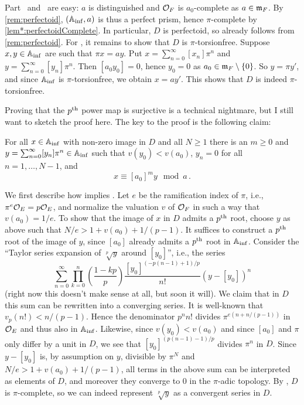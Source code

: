 \begin{proof*}
	Part~ and~ are easy: $a$ is distinguished and $\mathcal{O}_F$ is $a_0$-complete as $a\in\mathfrak{m}_F$. By \cref{rem:perfectoid}, $(\mathbb{A}_{\mathrm{inf}},a)$ is thus a perfect prism, hence $\pi$-complete by \cref{lem*:perfectoidComplete}. In particular, $D$ is perfectoid, so  already follows from \cref{rem:perfectoid}. For , it remains to show that $D$ is $\pi$-torsionfree. Suppose $x,y\in\mathbb{A}_{\mathrm{inf}}$ are such that $\pi x=ay$. Put $x=\sum_{n=0}^\infty[x_n]\pi^n$ and $y=\sum_{n=0}^\infty[y_n]\pi^n$. Then $[a_0y_0]=0$, hence $y_0=0$ as $a_0\in\mathfrak{m}_F\setminus\{0\}$. So $y=\pi y'$, and since $\mathbb{A}_{\mathrm{inf}}$ is $\pi$-torsionfree, we obtain $x=ay'$. This shows that $D$ is indeed $\pi$-torsionfree.
	
	Proving that the $p^{\text{th}}$ power map is surjective is a technical nightmare, but I still want to sketch the proof here. The key to the proof is the following claim:
	\begin{alphanumerate}
		\item[\itememph{*}] For all $x\in\mathbb{A}_{\mathrm{inf}}$ with non-zero image in $D$ and all $N\geq 1$ there is an $m\geq 0$ and $y=\sum_{n=0}^\infty[y_n]\pi^n\in\mathbb{A}_{\mathrm{inf}}$ such that $v(y_0)< v(a_0)$, $y_n=0$ for all $n=1,\dotsc,N-1$, and
		\begin{equation*}
			x\equiv [a_0]^my\mod a\,.
		\end{equation*}
	\end{alphanumerate}
	We first describe how \itememph{*} implies . Let $e$ be the ramification index of $\pi$, i.e., $\pi^e\mathcal{O}_E=p\mathcal{O}_E$, and normalize the valuation $v$ of $\mathcal{O}_F$ in such a way that $v(a_0)=1/e$. To show that the image of $x$ in $D$ admits a $p^{\text{th}}$ root, choose $y$ as above such that $N/e>1+v(a_0)+1/(p-1)$. It suffices to construct a $p^{\text{th}}$ root of the image of $y$, since $[a_0]$ already admits a $p^{\text{th}}$ root in $\mathbb{A}_{\mathrm{inf}}$. Consider the \enquote{Taylor series expansion of $\sqrt[p]{y}$ around $[y_0]$}, i.e., the series
	\begin{equation*}
		\sum_{n=0}^\infty\prod_{k=0}^n\left(\frac{1-kp}{p}\right)\frac{[y_0]^{(-p(n-1)+1)/p}}{n!}(y-[y_0])^n
	\end{equation*}
	(right now this doesn't make sense at all, but soon it will). We claim that in $D$ this sum can be rewritten into a converging series. It is well-known that $v_p(n!)<n/(p-1)$. Hence the denominator $p^nn!$ divides $\pi^{e(n+n/(p-1))}$ in $\mathcal{O}_E$ and thus also in $\mathbb{A}_{\mathrm{inf}}$. Likewise, since $v(y_0)<v(a_0)$ and since $[a_0]$ and $\pi$ only differ by a unit in $D$, we see that $[y_0]^{(p(n-1)-1)/p}$ divides $\pi^{n}$ in $D$. Since $y-[y_0]$ is, by assumption on $y$, divisible by $\pi^N$ and $N/e>1+v(a_0)+1/(p-1)$, all terms in the above sum can be interpreted as elements of $D$, and moreover they converge to $0$ in the $\pi$-adic topology. By , $D$ is $\pi$-complete, so we can indeed represent $\sqrt[p]{y}$ as a convergent series in $D$.
	

\end{proof*}
